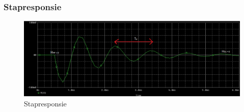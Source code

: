\documentclass[]{article}
\begin{document}
\subsubsection*{Stapresponsie}

\begin{figure}[H]
	\centering
	\includegraphics[width=13cm]{stap}
	\caption{Stapresponsie}
	\label{fig:stap}
\end{figure}
\end{document}
